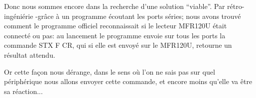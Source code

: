     Donc nous sommes encore dans la recherche d'une solution ``viable''. Par
rétro-ingéniérie -grâce à un programme écoutant les ports séries; nous avons
trouvé comment le programme officiel reconnaissait si le lecteur MFR120U était 
connecté ou pas: au lancement le programme envoie sur tous les ports la commande
STX F CR, qui si elle est envoyé sur le MFR120U, retourne un résultat attendu.

    Or cette façon nous dérange, dans le sens où l'on ne sais pas sur quel périphérique
nous allons envoyer cette commande, et encore moins qu'elle va être sa réaction...

